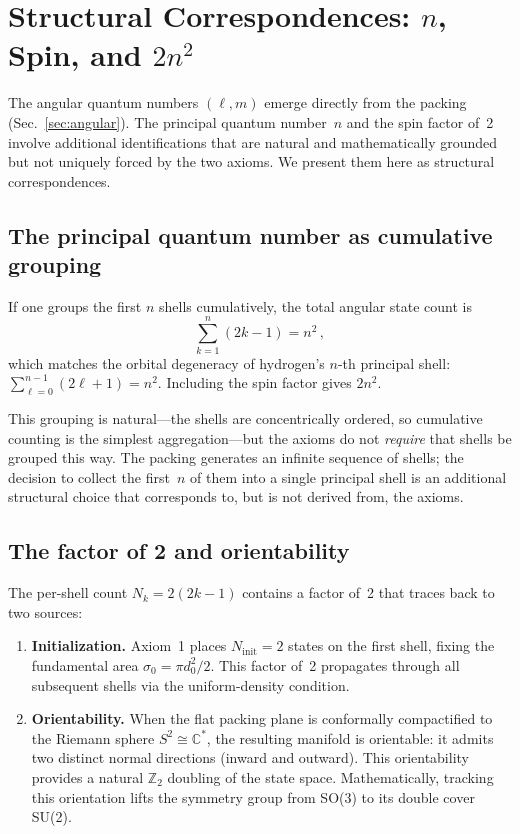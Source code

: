 \documentclass[aps,prl,reprint,amsmath,amssymb]{revtex4-2}
\begin{document}
\section{Structural Correspondences: $n$, Spin, and $2n^2$}
\label{sec:correspondences}

The angular quantum numbers $(\ell, m)$ emerge directly from the
packing (Sec.~\ref{sec:angular}).  The principal quantum number~$n$
and the spin factor of~2 involve additional identifications that are
natural and mathematically grounded but not uniquely forced by the two
axioms.  We present them here as structural correspondences.

\subsection{The principal quantum number as cumulative grouping}

If one groups the first $n$ shells cumulatively, the total angular
state count is
\begin{equation}
  \sum_{k=1}^{n} (2k - 1) = n^2 \,,
  \label{eq:n-squared}
\end{equation}
which matches the orbital degeneracy of hydrogen's $n$-th principal
shell: $\sum_{\ell=0}^{n-1}(2\ell+1) = n^2$.  Including the spin
factor gives $2n^2$.

This grouping is natural---the shells are concentrically ordered, so
cumulative counting is the simplest aggregation---but the axioms do
not \emph{require} that shells be grouped this way.  The packing
generates an infinite sequence of shells; the decision to collect the
first~$n$ of them into a single principal shell is an additional
structural choice that corresponds to, but is not derived from, the
axioms.

\subsection{The factor of 2 and orientability}

The per-shell count $N_k = 2(2k-1)$ contains a factor of~2 that
traces back to two sources:

\begin{enumerate}
\item \textbf{Initialization.}  Axiom~1 places
  $N_{\mathrm{init}} = 2$ states on the first shell, fixing the
  fundamental area $\sigma_0 = \pi d_0^2 / 2$.  This factor of~2
  propagates through all subsequent shells via the uniform-density
  condition.

\item \textbf{Orientability.}  When the flat packing plane is
  conformally compactified to the Riemann sphere
  $S^2 \cong \mathbb{C}^*$, the resulting manifold is orientable: it
  admits two distinct normal directions (inward and outward).  This
  orientability provides a natural $\mathbb{Z}_2$ doubling of the
  state space.  Mathematically, tracking this orientation lifts the
  symmetry group from SO(3) to its double cover SU(2).
\end{enumerate}
\end{document}
